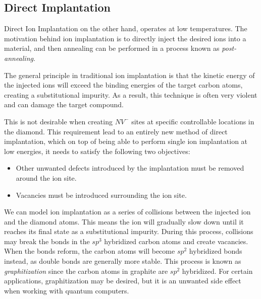 \documentclass[12pt]{article}
\begin{document}
    \subsection{Direct Implantation}
    Direct Ion Implantation on the other hand, operates at low temperatures. The motivation behind ion implantation is to directly inject the desired ions into a material, and then annealing can be performed in a process known as \textit{post-annealing}.

    The general principle in traditional ion implantation is that the kinetic energy of the injected ions will exceed the binding energies of the target carbon atoms, creating a substitutional impurity. As a result, this technique is often very violent and can damage the target compound\cite{best}.

    This is not desirable when creating $NV^{-}$ sites at specific controllable locations in the diamond. This requirement lead to an entirely new method of direct implantation, which on top of being able to perform single ion implantation at low energies, it needs to satisfy the following two objectives\cite{Kalish2014}:
    \begin{itemize}
        \item Other unwanted defects introduced by the implantation must be removed around the ion site.
        \item Vacancies must be introduced surrounding the ion site.
    \end{itemize}
    We can model ion implantation as a series of collisions between the injected ion and the diamond atoms. This means the ion will gradually slow down until it reaches its final state as a substitutional impurity. During this process, collisions may break the bonds in the $sp^3$ hybridized carbon atoms and create vacancies. When the bonds reform, the carbon atoms will become $sp^2$ hybridized bonds instead, as double bonds are generally more stable. This process is known as \textit{graphitization} since the carbon atoms in graphite are $sp^2$ hybridized\cite{Kalish2014}. For certain applications, graphitization may be desired, but it is an unwanted side effect when working with quantum computers.
    
\end{document}
